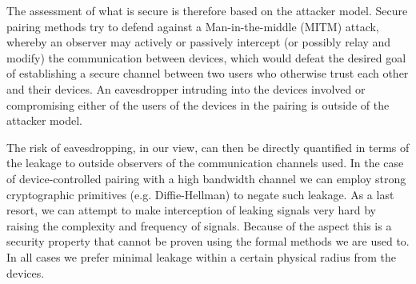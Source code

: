 \documentclass[conference, 11pt]{sty/IEEEtran}
\begin{document}
The assessment of what is secure is therefore based on the attacker model.
Secure pairing methods try to defend against a Man-in-the-middle (MITM) attack, whereby an observer may actively or passively intercept (or possibly relay and modify) the communication between devices, which would defeat the desired goal of establishing a secure channel between two users who otherwise trust each other and their devices.
An eavesdropper intruding into the devices involved or compromising either of the users of the devices in the pairing is outside of the attacker model.

The risk of eavesdropping, in our view, can then be directly quantified in terms of the leakage to outside observers of the communication channels used.
In the case of device-controlled pairing with a high bandwidth channel we can employ strong cryptographic primitives (e.g. Diffie-Hellman) to negate such leakage.
As a last resort, we can attempt to make interception of leaking signals very hard by raising the complexity and frequency of signals.
Because of the aspect this is a security property that cannot be proven using the formal methods we are used to.
In all cases we prefer minimal leakage within a certain physical radius from the devices.
\end{document}
